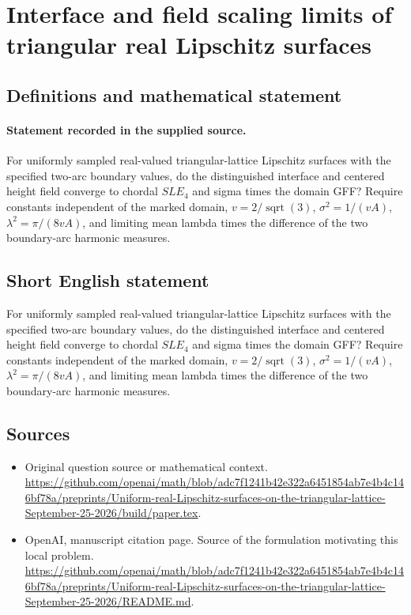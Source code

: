 \documentclass[11pt]{article}
\begin{document}
\section*{Interface and field scaling limits of triangular real Lipschitz surfaces}\label{statement}
\subsection{Definitions and mathematical statement}
\paragraph{Statement recorded in the supplied source.}
For uniformly sampled real-valued triangular-lattice Lipschitz surfaces with the specified two-arc boundary values, do the distinguished interface and centered height field converge to chordal $SLE_4$ and sigma times the domain GFF? Require constants independent of the marked domain, $v=2/\operatorname{sqrt}(3)$, $\sigma ^2=1/(vA)$, $\lambda ^2=\pi /(8vA)$, and limiting mean lambda times the difference of the two boundary-arc harmonic measures.
\subsection{Short English statement}
For uniformly sampled real-valued triangular-lattice Lipschitz surfaces with the specified two-arc boundary values, do the distinguished interface and centered height field converge to chordal $SLE_4$ and sigma times the domain GFF? Require constants independent of the marked domain, $v=2/\operatorname{sqrt}(3)$, $\sigma ^2=1/(vA)$, $\lambda ^2=\pi /(8vA)$, and limiting mean lambda times the difference of the two boundary-arc harmonic measures.
\subsection{Sources}
\begin{itemize}
\item[S1] Original question source or mathematical context.
\url{https://github.com/openai/math/blob/adc7f1241b42e322a6451854ab7e4b4c146bf78a/preprints/Uniform-real-Lipschitz-surfaces-on-the-triangular-lattice-September-25-2026/build/paper.tex}.
\item[S2] OpenAI, manuscript citation page. Source of the formulation motivating this local problem.
\url{https://github.com/openai/math/blob/adc7f1241b42e322a6451854ab7e4b4c146bf78a/preprints/Uniform-real-Lipschitz-surfaces-on-the-triangular-lattice-September-25-2026/README.md}.
\end{itemize}
\end{document}
